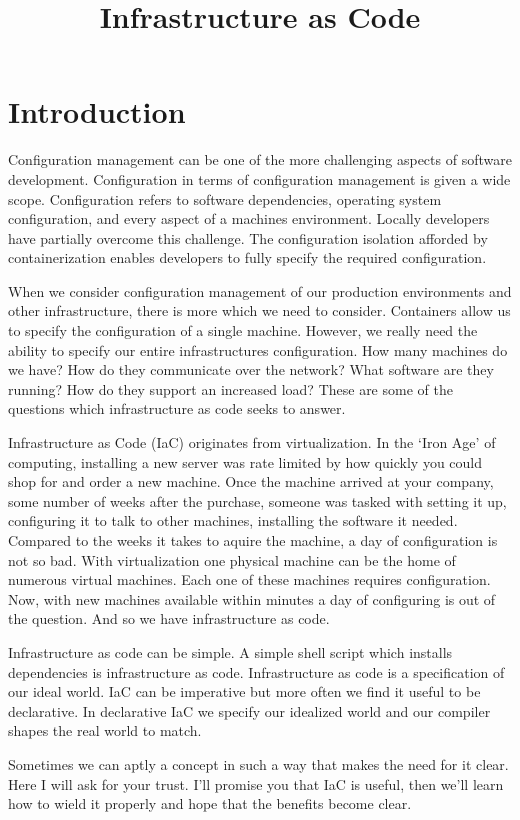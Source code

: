 \title{Infrastructure as Code}
\maketitle


\section{Introduction}
Configuration management can be one of the more challenging aspects of software development.
Configuration in terms of configuration management is given a wide scope.
Configuration refers to software dependencies, operating system configuration, and every aspect of a machines environment.
Locally developers have partially overcome this challenge.
The configuration isolation afforded by containerization enables developers to fully specify the required configuration.

When we consider configuration management of our production environments and other infrastructure,
there is more which we need to consider.
Containers allow us to specify the configuration of a single machine.
However, we really need the ability to specify our entire infrastructures configuration.
How many machines do we have?
How do they communicate over the network?
What software are they running?
How do they support an increased load?
These are some of the questions which infrastructure as code seeks to answer.

Infrastructure as Code (IaC) originates from virtualization.
In the `Iron Age' of computing, installing a new server was rate limited by how quickly you could shop for and order a new machine.
Once the machine arrived at your company, some number of weeks after the purchase,
someone was tasked with setting it up, configuring it to talk to other machines, installing the software it needed.
Compared to the weeks it takes to aquire the machine, a day of configuration is not so bad.
With virtualization one physical machine can be the home of numerous virtual machines.
Each one of these machines requires configuration.
Now, with new machines available within minutes a day of configuring is out of the question.
And so we have infrastructure as code.

Infrastructure as code can be simple.
A simple shell script which installs dependencies is infrastructure as code.
Infrastructure as code is a specification of our ideal world.
IaC can be imperative but more often we find it useful to be declarative.
In declarative IaC we specify our idealized world and our compiler shapes the real world to match.

Sometimes we can aptly a concept in such a way that makes the need for it clear.
Here I will ask for your trust.
I'll promise you that IaC is useful,
then we'll learn how to wield it properly and hope that the benefits become clear.
